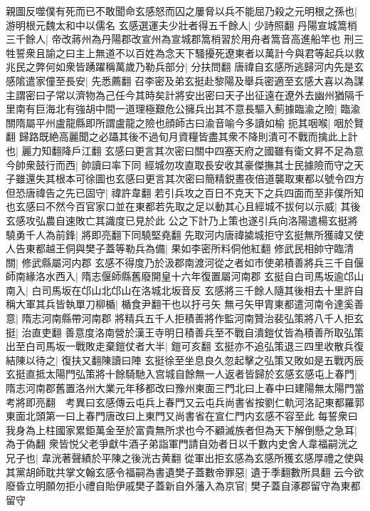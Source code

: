 親圖反噬僕有死而已不敢聞命玄感怒而囚之屢脅以兵不能屈乃殺之元明根之孫也|{
	游明根元魏太和中以儒名}
玄感選運夫少壯者得五千餘人|{
	少詩照翻}
丹陽宣城篙梢三千餘人|{
	帝改蔣州為丹陽郡改宣州為宣城郡篙梢習於用舟者篙音高進船竿也}
刑三牲誓衆且諭之曰主上無道不以百姓為念天下騷擾死遼東者以萬計今與君等起兵以救兆民之弊何如衆皆踴躍稱萬歲乃勒兵部分|{
	分扶問翻}
唐禕自玄感所逃歸河内先是玄感隂遣家僮至長安|{
	先悉薦翻}
召李密及弟玄挺赴黎陽及舉兵密適至玄感大喜以為謀主謂密曰子常以濟物為己任今其時矣計將安出密曰天子出征遠在遼外去幽州猶隔千里南有巨海北有強胡中間一道理極艱危公擁兵出其不意長驅入薊據臨渝之險|{
	臨渝關隋屬平州盧龍縣即所謂盧龍之險也顔師古曰渝音喻今多讀如榆}
扼其咽喉|{
	咽於賢翻}
歸路既絶高麗聞之必躡其後不過旬月資糧皆盡其衆不降則潰可不戰而擒此上計也|{
	麗力知翻降戶江翻}
玄感曰更言其次密曰關中四塞天府之國雖有衛文昇不足為意今帥衆鼓行而西|{
	帥讀曰率下同}
經城勿攻直取長安收其豪傑撫其士民據險而守之天子雖還失其根本可徐圖也玄感曰更言其次密曰簡精鋭晝夜倍道襲取東都以號令四方但恐唐禕告之先已固守|{
	禕許韋翻}
若引兵攻之百日不克天下之兵四面而至非僕所知也玄感曰不然今百官家口並在東都若先取之足以動其心且經城不拔何以示威|{
	其後玄感攻弘農自速敗亡其識度已見於此}
公之下計乃上策也遂引兵向洛陽遣楊玄挺將驍勇千人為前鋒|{
	將即亮翻下同驍堅堯翻}
先取河内唐禕㨿城拒守玄挺無所獲禕又使人告東都越王侗與樊子蓋等勒兵為備|{
	果如李密所料侗他紅翻}
修武民相帥守臨清關|{
	修武縣屬河内郡}
玄感不得度乃於汲郡南渡河從之者如市使弟積善將兵三千自偃師南緣洛水西入|{
	隋志偃師縣舊廢開皇十六年復置屬河南郡}
玄挺自白司馬坂逾邙山南入|{
	白司馬坂在邙山北邙山在洛城北坂音反}
玄感將三千餘人隨其後相去十里許自稱大軍其兵皆執單刀柳楯|{
	楯食尹翻干也以扜弓矢}
無弓矢甲胄東都遣河南令達奚善意|{
	隋志河南縣帶河南郡}
將精兵五千人拒積善將作監河南贊治裴弘策將八千人拒玄挺|{
	治直吏翻}
善意度洛南營於漢王寺明日積善兵至不戰自潰鎧仗皆為積善所取弘策出至白司馬坂一戰敗走棄鎧仗者大半|{
	鎧可亥翻}
玄挺亦不追弘策退三四里收散兵復結陳以待之|{
	復扶又翻陳讀曰陣}
玄挺徐至坐息良久忽起擊之弘策又敗如是五戰丙辰玄挺直抵太陽門弘策將十餘騎馳入宫城自餘無一人返者皆歸於玄感玄感屯上春門|{
	隋志河南郡舊置洛州大業元年移都改曰豫州東面三門北曰上春中曰建陽無太陽門當考將即亮翻　考異曰玄感傳云屯兵上春門又云屯兵尚書省按劉仁軌河洛記東都羅郭東面北頭第一曰上春門唐改曰上東門又尚書省在宣仁門内玄感不容至此}
每誓衆曰我身為上柱國家累鉅萬金至於富貴無所求也今不顧滅族者但為天下解倒懸之急耳|{
	為于偽翻}
衆皆悦父老爭獻牛酒子弟詣軍門請自効者日以千數内史舍人韋福嗣洸之兄子也|{
	韋洸著聲績於平陳之後洸古黄翻}
從軍出拒玄感為玄感所獲玄感厚禮之使與其黨胡師耽共掌文翰玄感令福嗣為書遺樊子蓋數帝罪惡|{
	遺于季翻數所具翻}
云今欲廢昏立明願勿拒小禮自貽伊戚樊子蓋新自外藩入為京官|{
	樊子蓋自涿郡留守為東都留守}
